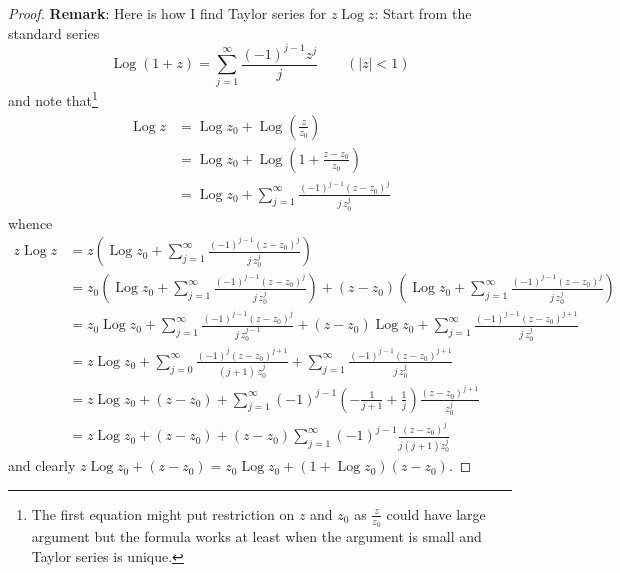 \documentclass[12pt]{article}
\newcommand{\Log}{\operatorname{Log}}
\begin{document}
\begin{proof}
\textbf{Remark}: Here is how I find Taylor series for $z \Log z$: Start from the standard series
$$\Log(1 + z) = \sum_{j = 1}^{\infty} \frac{(-1)^{j - 1} z^j}{j} \qquad (|z| < 1)$$
and note that\footnote{The first equation might put restriction on $z$ and $z_0$ as $\frac{z}{z_0}$ could have large argument but the formula works at least when the argument is small and Taylor series is unique.}
\begin{align*}
\Log z &= \Log z_0 + \Log\left(\frac{z}{z_0}\right)\\
&= \Log z_0 + \Log\left(1 + \frac{z - z_0}{z_0}\right)\\
&= \Log z_0 + \sum_{j = 1}^{\infty} \frac{(-1)^{j - 1} (z - z_0)^j}{j \, z_0^j}
\end{align*}
whence
\begin{align*}
z \Log z &= z \left( \Log z_0 + \sum_{j = 1}^{\infty} \frac{(-1)^{j - 1} (z - z_0)^j}{j \, z_0^j} \right)\\
&= z_0 \left( \Log z_0 + \sum_{j = 1}^{\infty} \frac{(-1)^{j - 1} (z - z_0)^j}{j \, z_0^j} \right) + (z - z_0) \left( \Log z_0 + \sum_{j = 1}^{\infty} \frac{(-1)^{j - 1} (z - z_0)^j}{j \, z_0^j} \right)\\
&= z_0 \Log z_0 + \sum_{j = 1}^{\infty} \frac{(-1)^{j - 1} (z - z_0)^j}{j \, z_0^{j - 1}} + (z - z_0) \Log z_0 + \sum_{j = 1}^{\infty} \frac{(-1)^{j - 1} (z - z_0)^{j + 1}}{j \, z_0^j}\\
&= z \Log z_0 + \sum_{j = 0}^{\infty} \frac{(-1)^{j} (z - z_0)^{j + 1}}{(j + 1) \, z_0^j} + \sum_{j = 1}^{\infty} \frac{(-1)^{j - 1} (z - z_0)^{j + 1}}{j \, z_0^j}\\
&= z \Log z_0 + (z - z_0) + \sum_{j = 1}^{\infty} (-1)^{j - 1} \left( -\frac{1}{j + 1} + \frac{1}{j} \right) \frac{(z - z_0)^{j + 1}}{z_0^j}\\
&= z \Log z_0 + (z - z_0) + (z - z_0) \sum_{j = 1}^{\infty} (-1)^{j - 1} \frac{(z - z_0)^j}{j (j + 1) z_0^j}
\end{align*}
and clearly $z \Log z_0 + (z - z_0) = z_0 \Log z_0 + (1 + \Log z_0) (z - z_0)$.
\end{proof}

\unless\ifdefined\IsMainDocument
\end{document}
